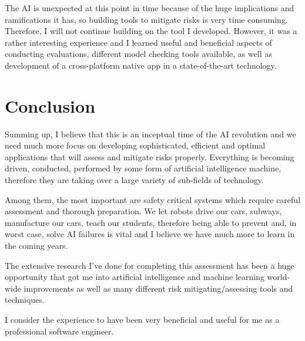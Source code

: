 \documentclass[paper=a4, fontsize=11pt]{scrartcl} %
\numberwithin{equation}{section} %
\numberwithin{figure}{section} %
\numberwithin{table}{section} %
\begin{document}
\par
The AI is unexpected at this point in time because of the huge implications and ramifications it has, so building tools
to mitigate risks is very time consuming. Therefore, I will not continue building on the tool I developed. However, it
was a rather interesting experience and I learned useful and beneficial aspects of conducting evaluations, different
model checking tools available, as well as development of a cross-platform native app in a state-of-the-art technology.



\section{Conclusion}

\par
Summing up, I believe that this is an inceptual time of the AI revolution and we need much more focus on developing
sophisticated, efficient and optimal applications that will assess and mitigate risks properly. Everything is becoming
driven, conducted, performed by some form of artificial intelligence machine, therefore they are taking over a large
variety of sub-fields of technology.

\par
Among them, the most important are safety critical systems which require careful assessment and thorough preparation. We
let robots drive our cars, subways, manufacture our cars, teach our students, therefore being able to prevent and, in
worst case, solve AI failures is vital and I believe we have much more to learn in the coming years.

\par
The extensive research I've done for completing this assessment has been a huge opportunity that got me into artificial
intelligence and machine learning world-wide improvements as well as many different risk mitigating/assessing tools and
techniques.

\par
I consider the experience to have been very beneficial and useful for me as a professional software engineer.




\end{document}
